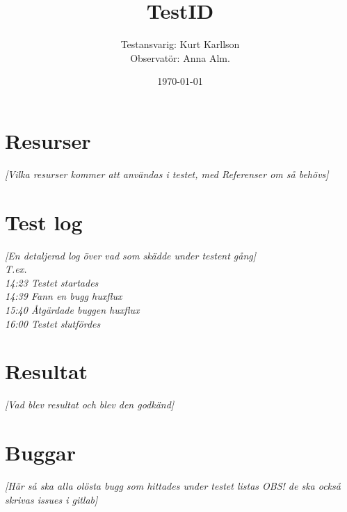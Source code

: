 \documentclass[a4paper,10pt]{article}
\title{TestID}
\author{Testansvarig: Kurt Karllson\\Observatör: Anna Alm.}
\date{\today}
\begin{document}
\maketitle\clearpage

\section{Resurser}
\emph{[Vilka resurser kommer att användas i testet, med Referenser om så behövs]}

\section{Test log}
\emph{[En detaljerad log över vad som skädde under testent gång]\\
T.ex. \\ 14:23 Testet startades \\ 14:39 Fann en bugg huxflux \\ 15:40 Åtgärdade buggen huxflux \\ 16:00 Testet slutfördes}
\

\section{Resultat}
\emph{[Vad blev resultat och blev den godkänd]}

\section{Buggar}
\emph{[Här så ska alla olösta bugg som hittades under testet listas OBS! de ska också skrivas issues i gitlab]}
\end{document}
